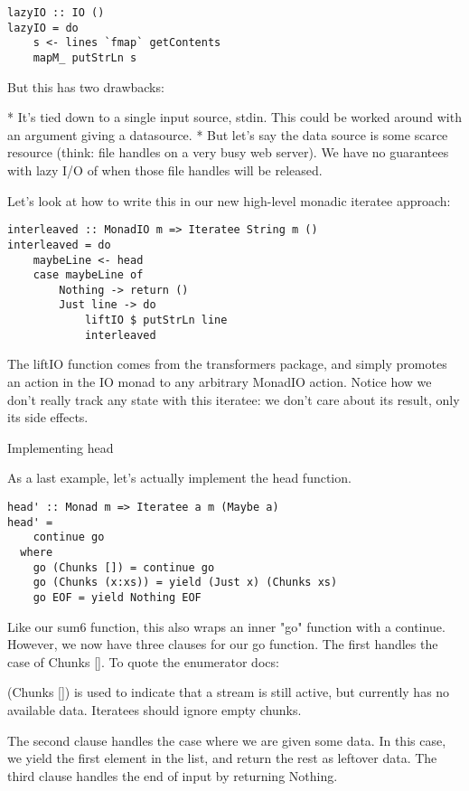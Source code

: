 \begin{lstlisting}
lazyIO :: IO ()
lazyIO = do
    s <- lines `fmap` getContents
    mapM_ putStrLn s
\end{lstlisting}

But this has two drawbacks:

* It's tied down to a single input source, stdin. This could be worked around with an argument giving a datasource.
* But let's say the data source is some scarce resource (think: file handles on a very busy web server). We have no guarantees with lazy I/O of when those file handles will be released.

Let's look at how to write this in our new high-level monadic iteratee approach:

\begin{lstlisting}
interleaved :: MonadIO m => Iteratee String m ()
interleaved = do
    maybeLine <- head
    case maybeLine of
        Nothing -> return ()
        Just line -> do
            liftIO $ putStrLn line
            interleaved
\end{lstlisting}

The liftIO function comes from the transformers package, and simply promotes an action in the IO monad to any arbitrary MonadIO action. Notice how we don't really track any state with this iteratee: we don't care about its result, only its side effects.

Implementing head

As a last example, let's actually implement the head function.

\begin{lstlisting}
head' :: Monad m => Iteratee a m (Maybe a)
head' =
    continue go
  where
    go (Chunks []) = continue go
    go (Chunks (x:xs)) = yield (Just x) (Chunks xs)
    go EOF = yield Nothing EOF
\end{lstlisting}

Like our sum6 function, this also wraps an inner "go" function with a continue. However, we now have three clauses for our go function. The first handles the case of Chunks []. To quote the enumerator docs:

(Chunks []) is used to indicate that a stream is still active, but currently has no available data. Iteratees should ignore empty chunks.

The second clause handles the case where we are given some data. In this case, we yield the first element in the list, and return the rest as leftover data. The third clause handles the end of input by returning Nothing.

